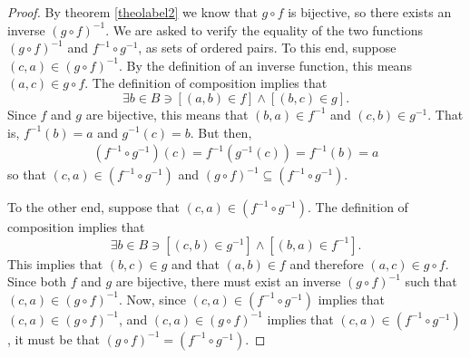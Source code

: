 \begin{proof}
	By theorem \ref{theolabel2} we know that $g\circ f$ is bijective, so there exists an inverse $(g\circ f)^{-1}$. We are asked to verify the equality of the two functions $(g\circ f)^{-1}$ and $f^{-1}\circ g^{-1}$, as sets of ordered pairs. To this end, suppose $(c,a)\in (g\circ f)^{-1}$. By the definition of an inverse function, this means $(a,c)\in g\circ f$. The definition of composition implies that
	$$\exists b\in B \ni [(a,b)\in f]\land [(b,c)\in g].$$
	Since $f$ and $g$ are bijective, this means that $(b,a)\in f^{-1}$ and $(c,b)\in g^{-1}$. That is, $f^{-1}(b)=a$ and $g^{-1}(c)=b$. But then,
	\begin{align}
		(f^{-1}\circ g^{-1})(c)=f^{-1}(g^{-1}(c))=f^{-1}(b)=a
	\end{align}
	so that $(c,a)\in (f^{-1}\circ g^{-1})$ and $(g\circ f)^{-1}\subseteq (f^{-1}\circ g^{-1})$.
	
	To the other end, suppose that $(c,a)\in (f^{-1}\circ g^{-1})$. The definition of composition implies that 
	$$\exists b\in B \ni [(c,b)\in g^{-1}]\land [(b,a)\in f^{-1}].$$
	This implies that $(b,c)\in g$ and that $(a,b)\in f$ and therefore $(a,c)\in g\circ f$. Since both $f$ and $g$ are bijective, there must exist an inverse $(g\circ f)^{-1}$ such that $(c,a)\in (g\circ f)^{-1}$. Now, since $(c,a)\in (f^{-1}\circ g^{-1})$ implies that $(c,a)\in (g\circ f)^{-1}$, and $(c,a)\in (g\circ f)^{-1}$ implies that $(c,a)\in (f^{-1}\circ g^{-1})$, it must be that $(g\circ f)^{-1} = (f^{-1}\circ g^{-1})$.
\end{proof}






























































